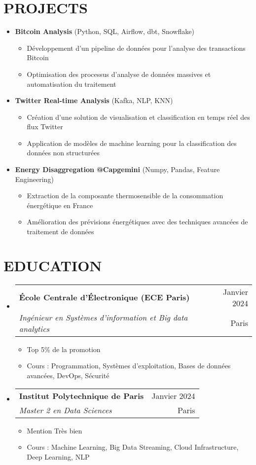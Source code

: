 \documentclass[letterpaper,11pt]{article}
\makeatletter
\newcommand{\resumeItem}[1]{
  \item\small{
    {#1 \vspace{-1pt}}
  }
}
\newcommand{\resumeSubheading}[4]{
  \vspace{-1pt}\item
    \begin{tabular*}{\textwidth}[t]{l@{\extracolsep{\fill}}r}
      \textbf{#1} & {\color{dark-grey}\small #2}\vspace{1pt}\\
      \textit{#3} & {\color{dark-grey} \small #4}\\
    \end{tabular*}\vspace{-4pt}
}
\newcommand{\resumeProjectHeading}[2]{
  \item
  {#1} \hfill {#2}
}
\newcommand{\resumeSubHeadingListStart}{\begin{itemize}[leftmargin=0in, label={}]}
\newcommand{\resumeSubHeadingListEnd}{\end{itemize}}
\newcommand{\resumeItemListStart}{\begin{itemize}}
\newcommand{\resumeItemListEnd}{\end{itemize}\vspace{0pt}}
\makeatother
\begin{document}
\section{PROJECTS}
\resumeSubHeadingListStart
      \resumeProjectHeading
          {\textbf{Bitcoin Analysis} \small{(Python, SQL, Airflow, dbt, Snowflake)}} {}
          \resumeItemListStart
            \resumeItem{Développement d'un pipeline de données pour l'analyse des transactions Bitcoin}
            \resumeItem{Optimisation des processus d'analyse de données massives et automatisation du traitement}
          \resumeItemListEnd
      \resumeProjectHeading
          {\textbf{Twitter Real-time Analysis} \small{(Kafka, NLP, KNN)}} {}
          \resumeItemListStart
            \resumeItem{Création d'une solution de visualisation et classification en temps réel des flux Twitter}
            \resumeItem{Application de modèles de machine learning pour la classification des données non structurées}
          \resumeItemListEnd
      \resumeProjectHeading
          {\textbf{Energy Disaggregation @Capgemini} \small{(Numpy, Pandas, Feature Engineering)}} {}
          \resumeItemListStart
            \resumeItem{Extraction de la composante thermosensible de la consommation énergétique en France}
            \resumeItem{Amélioration des prévisions énergétiques avec des techniques avancées de traitement de données}
          \resumeItemListEnd
    \resumeSubHeadingListEnd

\section{EDUCATION}
\resumeSubHeadingListStart
    \resumeSubheading
      {École Centrale d'Électronique (ECE Paris)}{Janvier 2024}
      {Ingénieur en Systèmes d'information et Big data analytics}{Paris}
      \resumeItemListStart
        \resumeItem{Top 5\% de la promotion}
        \resumeItem{Cours : Programmation, Syst\`emes d'exploitation, Bases de donn\'ees avanc\'ees, DevOps, S\'ecurit\'e}
      \resumeItemListEnd
    \resumeSubheading
      {Institut Polytechnique de Paris}{Janvier 2024}
      {Master 2 en Data Sciences}{Paris}
      \resumeItemListStart
        \resumeItem{Mention Tr\`es bien}
        \resumeItem{Cours : Machine Learning, Big Data Streaming, Cloud Infrastructure, Deep Learning, NLP}
      \resumeItemListEnd
  \resumeSubHeadingListEnd
\end{document}
